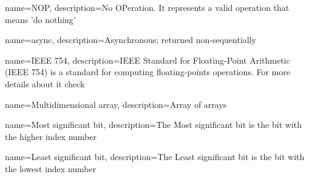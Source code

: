  {
	name=NOP,
	description={No OPeration. It represents a valid operation that means 'do nothing'}
}

 {
	name=async,
	description={Asynchronous; returned non-sequentially}
}

 {
	name=IEEE 754,
	description={IEEE Standard for Floating-Point Arithmetic (IEEE 754) is a standard for computing floating-points operations. For more details about it check \cite{IEEE-754}}
}

 {
	name=Multidimensional array,
	description={Array of arrays}
}

 {
	name=Most significant bit,
	description={The Most significant bit is the bit with the higher index number}
}

 {
	name=Least significant bit,
	description={The Least significant bit is the bit with the lowest index number}
}


